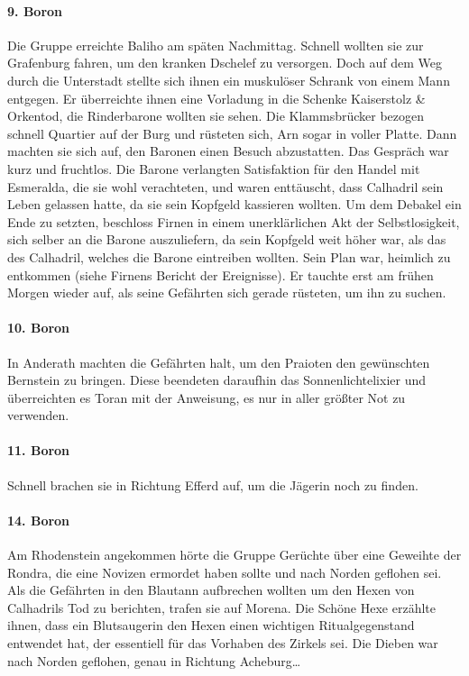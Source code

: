 \paragraph{9. Boron}
Die Gruppe erreichte Baliho am späten Nachmittag. Schnell wollten sie zur Grafenburg fahren, um den kranken Dschelef zu versorgen. Doch auf dem Weg durch die Unterstadt stellte sich ihnen ein muskulöser Schrank von einem Mann entgegen. Er überreichte ihnen eine Vorladung in die Schenke Kaiserstolz \& Orkentod, die Rinderbarone wollten sie sehen. Die Klammsbrücker bezogen schnell Quartier auf der Burg und rüsteten sich, Arn sogar in voller Platte. Dann machten sie sich auf, den Baronen einen Besuch abzustatten.
Das Gespräch war kurz und fruchtlos. Die Barone verlangten Satisfaktion für den Handel mit Esmeralda, die sie wohl verachteten, und waren enttäuscht, dass Calhadril sein Leben gelassen hatte, da sie sein Kopfgeld kassieren wollten. Um dem Debakel ein Ende zu setzten, beschloss Firnen in einem unerklärlichen Akt der Selbstlosigkeit, sich selber an die Barone auszuliefern, da sein Kopfgeld weit höher war, als das des Calhadril, welches die Barone eintreiben wollten. Sein Plan war, heimlich zu entkommen (siehe Firnens Bericht der Ereignisse).
Er tauchte erst am frühen Morgen wieder auf, als seine Gefährten sich gerade rüsteten, um ihn zu suchen.

\paragraph{10. Boron}
In Anderath machten die Gefährten halt, um den Praioten den gewünschten Bernstein zu bringen. Diese beendeten daraufhin das Sonnenlichtelixier und überreichten es Toran mit der Anweisung, es nur in aller größter Not zu verwenden.

\paragraph{11. Boron}
Schnell brachen sie in Richtung Efferd auf, um die Jägerin noch zu finden.

\paragraph{14. Boron}
Am Rhodenstein angekommen hörte die Gruppe Gerüchte über eine Geweihte der Rondra, die eine Novizen ermordet haben sollte und nach Norden geflohen sei. Als die Gefährten in den Blautann aufbrechen wollten um den Hexen von Calhadrils Tod zu berichten, trafen sie auf Morena. Die Schöne Hexe erzählte ihnen, dass ein Blutsaugerin den Hexen einen wichtigen Ritualgegenstand entwendet hat, der essentiell für das Vorhaben des Zirkels sei. Die Dieben war nach Norden geflohen, genau in Richtung Acheburg\dots 



